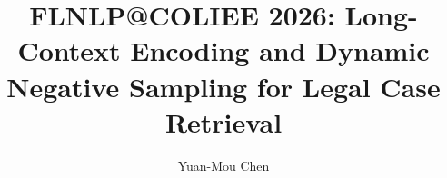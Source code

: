 \title[FLNLP@COLIEE 2026: Long-Context Encoding and Dynamic Negative Sampling for Legal Case Retrieval]{FLNLP@COLIEE 2026: Long-Context Encoding and Dynamic Negative Sampling for Legal Case Retrieval}
\author[Yuan-Mou Chen]{Yuan-Mou Chen}

